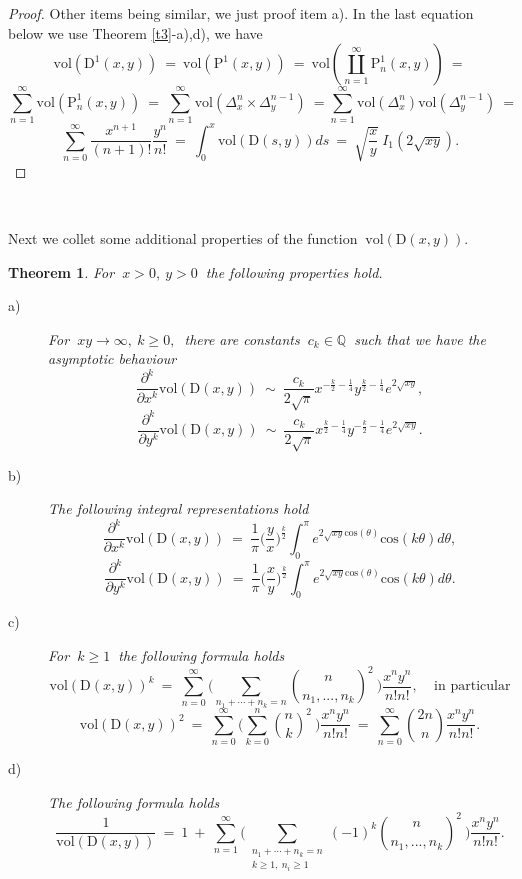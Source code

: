 \documentclass[10pt,leqeq]{article}
\newtheorem{thm}{Theorem}%
\begin{document}
\begin{proof} Other items being similar, we just proof item a). In the last equation below we use Theorem \ref{t3}-a),d), we have 
$$\mathrm{vol}(\mathrm{D}^{1}(x,y)) \ = \  \mathrm{vol}(\mathrm{P}^{1}(x,y))
\ = \  \mathrm{vol}(\coprod_{n=1}^{\infty}\mathrm{P}_n^{1}(x,y)) \ = $$
$$\sum_{n=1}^{\infty} \mathrm{vol}(\mathrm{P}_n^{1}(x,y))  \ = \ 
\sum_{n=1}^{\infty} \mathrm{vol}(\Delta_x^{n}\times \Delta_y^{n-1}) \ = 
\sum_{n=1}^{\infty} \mathrm{vol}(\Delta_x^{n})\mathrm{vol}(\Delta_y^{n-1}) \ =$$
$$\sum_{n=0}^{\infty} \frac{x^{n+1}}{(n+1)!}\frac{y^{n}}{n!} \ = \ \int_{0}^{x}\mathrm{vol}(\mathrm{D}(s,y))ds \ = \ \sqrt{\frac{x}{y} } \ I_1(2\sqrt{xy}).$$
\end{proof}

\

Next we collet some additional properties of the function
$\ \mathrm{vol}(\mathrm{D}(x,y)). $\\


\begin{thm}
{\em For $\ x>0, \ y> 0 \ $ the following properties hold.
\begin{description}
  \item[a)] For $\ xy \rightarrow \infty, \  k \geq 0, \ $ there are constants $\ c_k \in \mathbb{Q} \ $ such that  we have the asymptotic behaviour 
   $$ \frac{\partial^k}{\partial x^k} \mathrm{vol}(\mathrm{D}(x,y)) \  \sim \ 
   \frac{c_k}{2\sqrt{\pi}}
   x^{-\frac{k}{2}-\frac{1}{4}}y^{\frac{k}{2}-\frac{1}{4}}e^{2\sqrt{xy}},
   $$
    $$\frac{\partial^k}{\partial y^k} \mathrm{vol}(\mathrm{D}(x,y)) \  \sim \ 
   \frac{c_k}{2\sqrt{\pi}}
   x^{\frac{k}{2}-\frac{1}{4}}y^{-\frac{k}{2}-\frac{1}{4}}e^{2\sqrt{xy}}.$$
  \item[b)] The following integral representations hold
  $$ \displaystyle \frac{\partial^k}{\partial x^k}\mathrm{vol}(\mathrm{D}(x,y))  \ = \  \frac{1}{\pi}\bigg(\frac{y}{x}\bigg)^{\frac{k}{2}}
  \int_{0}^{\pi}e^{2\sqrt{xy}\mathrm{cos}(\theta)}\mathrm{cos}(k\theta)d\theta,$$
  $$\frac{\partial^k}{\partial y^k}\mathrm{vol}(\mathrm{D}(x,y))  \ = \  \frac{1}{\pi}\bigg(\frac{x}{y}\bigg)^{\frac{k}{2}}
  \int_{0}^{\pi}e^{2\sqrt{xy}\mathrm{cos}(\theta)}\mathrm{cos}(k\theta)d\theta. $$
  \item[c)] For $ \ k \geq 1 \ $ the following formula holds
  $$\mathrm{vol}(\mathrm{D}(x,y))^k \ = \ 
   \sum_{n=0}^{\infty}\bigg( \sum_{n_1+\cdots + n_k=n} \binom{n}{n_1,...,n_k}^2 \ \bigg)\frac{x^ny^n}{n!n!}, \ \ \ \ \ \mbox{in particular}$$
  $$\mathrm{vol}(\mathrm{D}(x,y))^2 \ = \ 
   \sum_{n=0}^{\infty}\bigg( \sum_{k=0}^n \binom{n}{k}^2 \ \bigg)\frac{x^ny^n}{n!n!} \ = \ \sum_{n=0}^{\infty}\binom{2n}{n}\frac{x^ny^n}{n!n!}.$$
  \item[d)] The following formula holds
  $$\frac{1}{\mathrm{vol}(\mathrm{D}(x,y))}\ = \ 
   1\ + \ \sum_{n=1}^{\infty}\bigg(
   \sum_{\substack{n_1+\cdots + n_k=n \\ k\geq 1, \ n_i\geq 1}}
    (-1)^k\binom{n}{n_1,...,n_k}^2 \ \bigg)\frac{x^ny^n}{n!n!}.$$
\end{description}
  

}
\end{thm}
\end{document}
